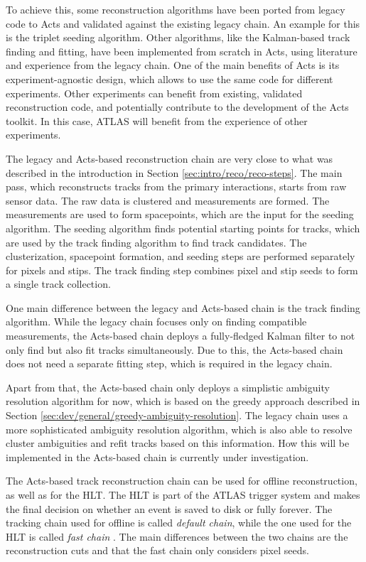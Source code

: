 To achieve this, some reconstruction algorithms have been ported from legacy code to Acts and validated against the existing legacy chain. An example for this is the triplet seeding algorithm. Other algorithms, like the Kalman-based track finding and fitting, have been implemented from scratch in Acts, using literature and experience from the legacy chain. One of the main benefits of Acts is its experiment-agnostic design, which allows to use the same code for different experiments. Other experiments can benefit from existing, validated reconstruction code, and potentially contribute to the development of the Acts toolkit. In this case, ATLAS will benefit from the experience of other experiments.

The legacy and Acts-based reconstruction chain are very close to what was described in the introduction in Section \ref{sec:intro/reco/reco-steps}. The main pass, which reconstructs tracks from the primary interactions, starts from raw sensor data. The raw data is clustered and measurements are formed. The measurements are used to form spacepoints, which are the input for the seeding algorithm. The seeding algorithm finds potential starting points for tracks, which are used by the track finding algorithm to find track candidates. The clusterization, spacepoint formation, and seeding steps are performed separately for pixels and stips. The track finding step combines pixel and stip seeds to form a single track collection.

One main difference between the legacy and Acts-based chain is the track finding algorithm. While the legacy chain focuses only on finding compatible measurements, the Acts-based chain deploys a fully-fledged Kalman filter to not only find but also fit tracks simultaneously. Due to this, the Acts-based chain does not need a separate fitting step, which is required in the legacy chain.

Apart from that, the Acts-based chain only deploys a simplistic ambiguity resolution algorithm for now, which is based on the greedy approach described in Section \ref{sec:dev/general/greedy-ambiguity-resolution}. The legacy chain uses a more sophisticated ambiguity resolution algorithm, which is also able to resolve cluster ambiguities and refit tracks based on this information. How this will be implemented in the Acts-based chain is currently under investigation.

The Acts-based track reconstruction chain can be used for offline reconstruction, as well as for the HLT. The HLT is part of the ATLAS trigger system and makes the final decision on whether an event is saved to disk or fully forever. The tracking chain used for offline is called \textit{default chain}, while the one used for the HLT is called \textit{fast chain} \cite{pubnote-2019-041}. The main differences between the two chains are the reconstruction cuts and that the fast chain only considers pixel seeds.

